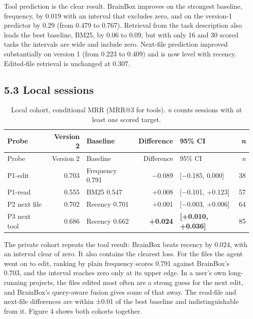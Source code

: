 \documentclass[
  american,
  11pt,
]{article}
\begin{document}
Tool prediction is the clear result. BrainBox improves on the strongest baseline, frequency, by 0.019 with an
interval that excludes zero, and on the version-1 predictor by 0.29 (from 0.479 to 0.767). Retrieval from the
task description also leads the best baseline, BM25, by 0.06 to 0.09, but with only 16 and 30 scored tasks the
intervals are wide and include zero. Next-file prediction improved substantially on version 1 (from 0.223 to
0.409) and is now level with recency. Edited-file retrieval is unchanged at 0.307.

\subsection{5.3 Local sessions}\label{local-sessions}

\begin{longtable}[]{@{}lrlrlr@{}}
\caption{Local cohort, conditional MRR (MRR@3 for tools). \emph{n} counts sessions with at least one scored
target.}\tabularnewline
\toprule\noalign{}
Probe & Version 2 & Baseline & Difference & 95\% CI & \emph{n} \\
\midrule\noalign{}
\endfirsthead
\toprule\noalign{}
Probe & Version 2 & Baseline & Difference & 95\% CI & \emph{n} \\
\midrule\noalign{}
\endhead
\bottomrule\noalign{}
\endlastfoot
P1-edit & 0.703 & Frequency 0.791 & −0.089 & {[}−0.185, 0.000{]} & 38 \\
P1-read & 0.555 & BM25 0.547 & +0.008 & {[}−0.101, +0.123{]} & 57 \\
P2 next file & 0.702 & Recency 0.701 & +0.001 & {[}−0.003, +0.006{]} & 64 \\
P3 next tool & 0.686 & Recency 0.662 & \textbf{+0.024} & \textbf{{[}+0.010, +0.036{]}} & 85 \\
\end{longtable}

The private cohort repeats the tool result: BrainBox beats recency by 0.024, with an interval clear of zero.
It also contains the clearest loss. For the files the agent went on to edit, ranking by plain frequency scores
0.791 against BrainBox's 0.703, and the interval reaches zero only at its upper edge. In a user's own
long-running projects, the files edited most often are a strong guess for the next edit, and BrainBox's
query-aware fusion gives some of that away. The read-file and next-file differences are within ±0.01 of the
best baseline and indistinguishable from it. Figure 4 shows both cohorts together.
\end{document}

